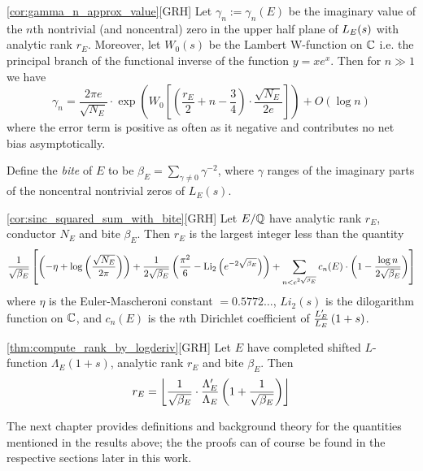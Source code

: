 \begin{quotedcorollary}{\ref{cor:gamma_n_approx_value}}[GRH]
Let $\gamma_n := \gamma_n(E)$ be the imaginary value of the $n$th nontrivial (and noncentral) zero in the upper half plane of $L_E(s)$ with analytic rank $r_E$.  Moreover, let $W_0 (s)$ be the Lambert W-function on $\mathbb{C}$ i.e. the principal branch of the functional inverse of the function $y = x e^x$. Then for $n \gg 1$ we have
\begin{equation}
\gamma_n = \frac{2\pi e}{\sqrt{N_E}} \cdot \exp \left(W_0\left[\left(\frac{r_E}{2} +n - \frac{3}{4}\right)\cdot \frac{\sqrt{N_E}}{2 e}\right]\right) + O(\log n)
\end{equation}
where the error term is positive as often as it negative and contributes no net bias asymptotically.
\end{quotedcorollary}

Define the {\it bite} of $E$ to be $\beta_E = \sum_{\gamma \ne 0} \gamma^{-2}$, where $\gamma$ ranges of the imaginary parts of the noncentral nontrivial zeros of $L_E(s)$.
\begin{quotedcorollary}{\ref{cor:sinc_squared_sum_with_bite}}[GRH]
Let $E/\mathbb{Q}$ have analytic rank $r_E$, conductor $N_E$ and bite $\beta_E$. Then $r_E$ is the largest integer less than the quantity
\begin{equation}
\frac{1}{\sqrt{\beta_E}}\left[\left(-\eta + \log\left(\frac{\sqrt{N_E}}{2\pi}\right)\right)+ \frac{1}{2 \sqrt{\beta_E}}\left(\frac{\pi^2}{6} - \operatorname{Li}_2\left(e^{-2\sqrt{\beta_E}}\right)\right) + \sum_{n<e^{2\sqrt{\beta_E}}} c_n(E) \cdot \left(1-\frac{\log n}{2\sqrt{\beta_E}}\right)\right]
\end{equation}
where $\eta$ is the Euler-Mascheroni constant $= 0.5772\ldots$, $Li_2(s)$ is the dilogarithm function on $\mathbb{C}$, and $c_n(E)$ is the $n$th Dirichlet coefficient of $\frac{L_E^{\prime}}{L_E}\left(1+s\right)$.
\end{quotedcorollary}

\begin{quotedtheorem}{\ref{thm:compute_rank_by_logderiv}}[GRH]
Let $E$ have completed shifted $L$-function $\Lambda_E(1+s)$, analytic rank $r_E$ and bite $\beta_E$. Then
\begin{equation}
r_E = \left\lfloor\frac{1}{\sqrt{\beta_E}}\cdot \frac{\Lambda_E^{\prime}}{\Lambda_E}\left(1+\frac{1}{\sqrt{\beta_E}}\right)\right\rfloor
\end{equation}
\end{quotedtheorem}

The next chapter provides definitions and background theory for the quantities mentioned in the results above; the the proofs can of course be found in the respective sections later in this work.

